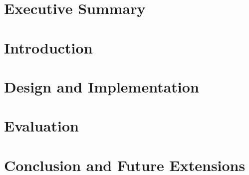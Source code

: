 \documentclass[11pt,a4paper,oneside]{report}
\begin{document}






\section{Executive Summary}



\section{Introduction}



\section{Design and Implementation}



\section{Evaluation}




\section{Conclusion and Future Extensions}
\end{document}
